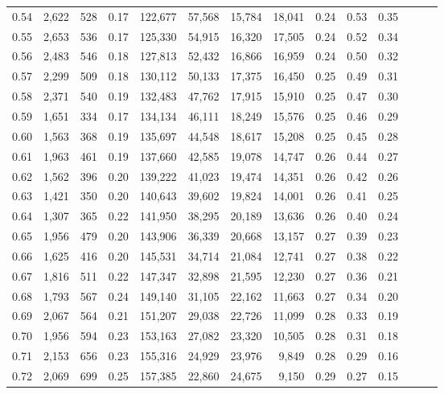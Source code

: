 \begin{tabular}{rrrrrrrrrrrrrr}
0.54 &  2,622 &  528 &  0.17 &  122,677 &   57,568 &  15,784 &  18,041 &  0.24 &  0.53 &      0.35 \\
0.55 &  2,653 &  536 &  0.17 &  125,330 &   54,915 &  16,320 &  17,505 &  0.24 &  0.52 &      0.34 \\
0.56 &  2,483 &  546 &  0.18 &  127,813 &   52,432 &  16,866 &  16,959 &  0.24 &  0.50 &      0.32 \\
0.57 &  2,299 &  509 &  0.18 &  130,112 &   50,133 &  17,375 &  16,450 &  0.25 &  0.49 &      0.31 \\
0.58 &  2,371 &  540 &  0.19 &  132,483 &   47,762 &  17,915 &  15,910 &  0.25 &  0.47 &      0.30 \\
0.59 &  1,651 &  334 &  0.17 &  134,134 &   46,111 &  18,249 &  15,576 &  0.25 &  0.46 &      0.29 \\
0.60 &  1,563 &  368 &  0.19 &  135,697 &   44,548 &  18,617 &  15,208 &  0.25 &  0.45 &      0.28 \\
0.61 &  1,963 &  461 &  0.19 &  137,660 &   42,585 &  19,078 &  14,747 &  0.26 &  0.44 &      0.27 \\
0.62 &  1,562 &  396 &  0.20 &  139,222 &   41,023 &  19,474 &  14,351 &  0.26 &  0.42 &      0.26 \\
0.63 &  1,421 &  350 &  0.20 &  140,643 &   39,602 &  19,824 &  14,001 &  0.26 &  0.41 &      0.25 \\
0.64 &  1,307 &  365 &  0.22 &  141,950 &   38,295 &  20,189 &  13,636 &  0.26 &  0.40 &      0.24 \\
0.65 &  1,956 &  479 &  0.20 &  143,906 &   36,339 &  20,668 &  13,157 &  0.27 &  0.39 &      0.23 \\
0.66 &  1,625 &  416 &  0.20 &  145,531 &   34,714 &  21,084 &  12,741 &  0.27 &  0.38 &      0.22 \\
0.67 &  1,816 &  511 &  0.22 &  147,347 &   32,898 &  21,595 &  12,230 &  0.27 &  0.36 &      0.21 \\
0.68 &  1,793 &  567 &  0.24 &  149,140 &   31,105 &  22,162 &  11,663 &  0.27 &  0.34 &      0.20 \\
0.69 &  2,067 &  564 &  0.21 &  151,207 &   29,038 &  22,726 &  11,099 &  0.28 &  0.33 &      0.19 \\
0.70 &  1,956 &  594 &  0.23 &  153,163 &   27,082 &  23,320 &  10,505 &  0.28 &  0.31 &      0.18 \\
0.71 &  2,153 &  656 &  0.23 &  155,316 &   24,929 &  23,976 &   9,849 &  0.28 &  0.29 &      0.16 \\
0.72 &  2,069 &  699 &  0.25 &  157,385 &   22,860 &  24,675 &   9,150 &  0.29 &  0.27 &      0.15 \\

\end{tabular}
